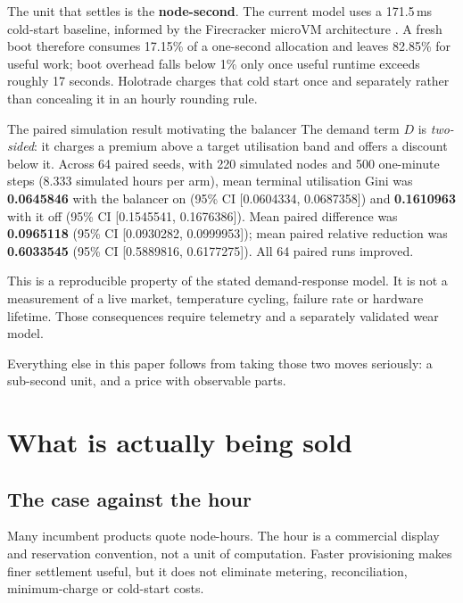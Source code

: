\documentclass[11pt,letterpaper]{article}
\newcommand{\tagbox}[3]{\tikz[baseline=(X.base)]{\node[inner xsep=3.5pt,inner ysep=1.4pt,rounded corners=1.6pt,fill=#1,text=#2,font=\bfseries\sffamily\tiny] (X) {#3};}}
\newcommand{\MODELLED}{\tagbox{amberlite}{amber!55!black}{MODELLED}}
\begin{document}
The unit that settles is the \textbf{node-second}. The current model uses a
171.5\,ms cold-start baseline, informed by the Firecracker microVM architecture
\cite{agache2020firecracker}. \MODELLED{} A fresh boot therefore consumes
17.15\% of a one-second allocation and leaves 82.85\% for useful work; boot
overhead falls below 1\% only once useful runtime exceeds roughly 17 seconds.
Holotrade charges that cold start once and separately rather than concealing it
in an hourly rounding rule.

\begin{resultbox}{The paired simulation result motivating the balancer}
The demand term $D$ is \emph{two-sided}: it charges a premium above a target
utilisation band and offers a discount below it. Across 64 paired seeds, with
220 simulated nodes and 500 one-minute steps (8.333 simulated hours per arm),
mean terminal utilisation Gini was \textbf{0.0645846} with the balancer on
(95\% CI [0.0604334, 0.0687358]) and \textbf{0.1610963} with it off
(95\% CI [0.1545541, 0.1676386]). Mean paired difference was
\textbf{0.0965118} (95\% CI [0.0930282, 0.0999953]); mean paired relative
reduction was \textbf{0.6033545} (95\% CI [0.5889816, 0.6177275]). All 64
paired runs improved. \MODELLED

\vspace{4pt}
This is a reproducible property of the stated demand-response model. It is not a
measurement of a live market, temperature cycling, failure rate or hardware
lifetime. Those consequences require telemetry and a separately validated wear
model.
\end{resultbox}

Everything else in this paper follows from taking those two moves seriously: a
sub-second unit, and a price with observable parts.

\newpage

\section{What is actually being sold}

\subsection{The case against the hour}

Many incumbent products quote node-hours. The hour is a commercial display and
reservation convention, not a unit of computation. Faster provisioning makes
finer settlement useful, but it does not eliminate metering, reconciliation,
minimum-charge or cold-start costs.
\end{document}
